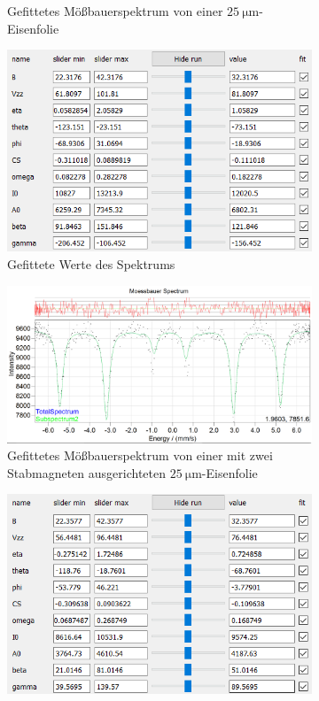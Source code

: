 \documentclass[german, %
parskip=full, %
bibliography=totoc, %
]{scrartcl}
\begin{document}
\begin{figure}[ht]
\begin{subfigure}[b]{0.5\textwidth}
	  \caption{Gefittetes Mößbauerspektrum von einer \(\SI{25}{\micro\meter}\)-Eisenfolie}
	  \label{fig:moess25oA}
  \end{subfigure}
  \begin{subfigure}[b]{0.4\textwidth}
	  \includegraphics[width=\textwidth]{WerteEisen25OhneAnpassung}
	  \caption{Gefittete Werte des Spektrums}
	  \label{fig:werte25oA}
  \end{subfigure}
	\begin{subfigure}[b]{0.5\textwidth}
		\includegraphics[width=\textwidth]{MoessbauerEisen25MagnetGeradeOhneAnpassung}
	  \caption{Gefittetes Mößbauerspektrum von einer mit zwei Stabmagneten ausgerichteten \(\SI{25}{\micro\meter}\)-Eisenfolie}
	  \label{fig:moess25geradeoA}
  \end{subfigure}
  \begin{subfigure}[b]{0.4\textwidth}
	  \includegraphics[width=\textwidth]{WerteEisen25MagnetGeradeOhneAnpassung}

\end{subfigure}
\end{figure}
\end{document}
